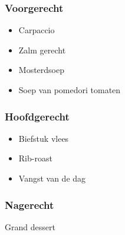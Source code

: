 \subsubsection*{Voorgerecht}
\begin{itemize}
	\item Carpaccio
	\item Zalm gerecht
	\item Mosterdsoep
	\item Soep van pomedori tomaten
\end{itemize}

\subsubsection*{Hoofdgerecht}
\begin{itemize}
	\item Biefstuk vlees
	\item Rib-roast
	\item Vangst van de dag
\end{itemize}

\subsubsection*{Nagerecht}
Grand dessert
